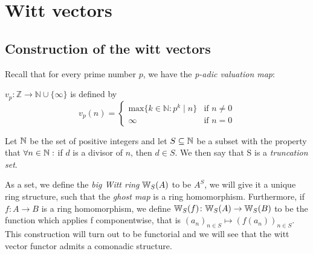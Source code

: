 \chapter{Witt vectors}
\section{Construction of the witt vectors}

Recall that for every prime number $p$, we have the \textit{p-adic valuation map}:
\begin{definition}
   $v_p \colon \mathbb{Z} \to \mathbb{N} \cup\{\infty\}$
    is defined by 
    \[
        v_p(n)=
        \begin{cases}
        \mathrm{max}\{k \in \mathbb{N} : p^k \mid n\} & \text{if } n \neq 0\\
        \infty & \text{if } n=0
        \end{cases} 
    \]

\end{definition} 

\begin{definition}
    Let $\mathbb{N}$ be the set of positive integers and let $S\subseteq
    \mathbb{N}$ be a subset with the property that $\forall n\in \mathbb{N}:$
    if $d$ is a divisor of $n$, then $d\in S$.
    We then say that S is a \textit{truncation set}.
\end{definition}
As a set, we define the \textit{big Witt ring} $\mathbb{W}_S(A)$ to be $A^S$,
we will give it a unique ring structure, such that the \textit{ghost map}
is a ring homomorphism. Furthermore, if $f \colon A \to B$ is a ring homomorphism,
we define $\mathbb{W}_S(f) \colon \mathbb{W}_S(A) \to \mathbb{W}_S(B)$ to be the function which applies
f componentwise, that is 
$(a_n)_{n \in S} \mapsto (f(a_n))_{n \in S}$.
This construction will turn out to be functorial and we will
see that the witt vector functor admits a comonadic structure.

